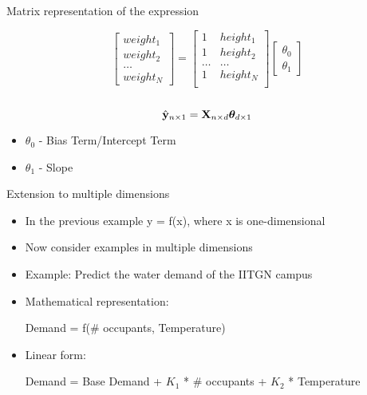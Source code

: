 \documentclass{beamer}
\begin{document}
\begin{frame}{Matrix representation of the expression}



\[\begin{bmatrix}
    weight_{1}   \\
    weight_{2}   \\
    \dots \\
    weight_{N}
\end{bmatrix}
= \begin{bmatrix}
    1& height_{1}   \\
    1& height_{2}   \\
    \dots & \dots  \\
    1& height_{N}   \\
\end{bmatrix}
\begin{bmatrix}
    \theta_{0} \\
    \theta_{1}
\end{bmatrix}\] \\

\pause \[\hat{\mathbf{y}}_{n \times 1} = \mathbf{X}_{n \times d} \boldsymbol{\theta}_{d \times 1} \]




\pause \begin{itemize}
    \item<+-> $\theta_{0}$ - Bias Term/Intercept Term
    \item<+-> $\theta_{1}$ - Slope
\end{itemize}
\end{frame}



\begin{frame}{Extension to multiple dimensions}

\begin{itemize}[<+->]
    \item In the previous example y = f(x), where x is one-dimensional
    \item Now consider examples in multiple dimensions
    \item Example: Predict the water demand of the IITGN campus
    \item \small{Mathematical representation:
        \begin{center}
            \begin{tcolorbox}
                Demand = f(\# occupants, Temperature)
            \end{tcolorbox}
        \end{center}}
    \item \small{Linear form:
        \begin{center}
            \begin{tcolorbox}
                Demand = Base Demand + $K_{1}$ * \# occupants + $K_{2}$ * Temperature
            \end{tcolorbox}
        \end{center}}
\end{itemize}

\end{frame}
\end{document}
